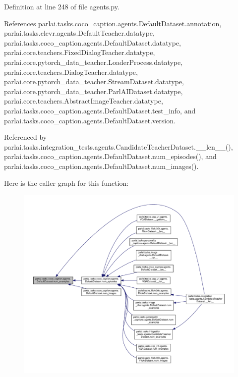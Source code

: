 Definition at line 248 of file agents.\+py.



References parlai.\+tasks.\+coco\+\_\+caption.\+agents.\+Default\+Dataset.\+annotation, parlai.\+tasks.\+clevr.\+agents.\+Default\+Teacher.\+datatype, parlai.\+tasks.\+coco\+\_\+caption.\+agents.\+Default\+Dataset.\+datatype, parlai.\+core.\+teachers.\+Fixed\+Dialog\+Teacher.\+datatype, parlai.\+core.\+pytorch\+\_\+data\+\_\+teacher.\+Loader\+Process.\+datatype, parlai.\+core.\+teachers.\+Dialog\+Teacher.\+datatype, parlai.\+core.\+pytorch\+\_\+data\+\_\+teacher.\+Stream\+Dataset.\+datatype, parlai.\+core.\+pytorch\+\_\+data\+\_\+teacher.\+Parl\+A\+I\+Dataset.\+datatype, parlai.\+core.\+teachers.\+Abstract\+Image\+Teacher.\+datatype, parlai.\+tasks.\+coco\+\_\+caption.\+agents.\+Default\+Dataset.\+test\+\_\+info, and parlai.\+tasks.\+coco\+\_\+caption.\+agents.\+Default\+Dataset.\+version.



Referenced by parlai.\+tasks.\+integration\+\_\+tests.\+agents.\+Candidate\+Teacher\+Dataset.\+\_\+\+\_\+len\+\_\+\+\_\+(), parlai.\+tasks.\+coco\+\_\+caption.\+agents.\+Default\+Dataset.\+num\+\_\+episodes(), and parlai.\+tasks.\+coco\+\_\+caption.\+agents.\+Default\+Dataset.\+num\+\_\+images().

Here is the caller graph for this function\+:
\nopagebreak
\begin{figure}[H]
\begin{center}
\leavevmode
\includegraphics[width=350pt]{classparlai_1_1tasks_1_1coco__caption_1_1agents_1_1DefaultDataset_aec6fa2ed48a0ef6af6d2088fc2506623_icgraph}
\end{center}
\end{figure}
\mbox{\label{classparlai_1_1tasks_1_1coco__caption_1_1agents_1_1DefaultDataset_a72b989d5f9bf33fb573c89d9645e16ea}} 
